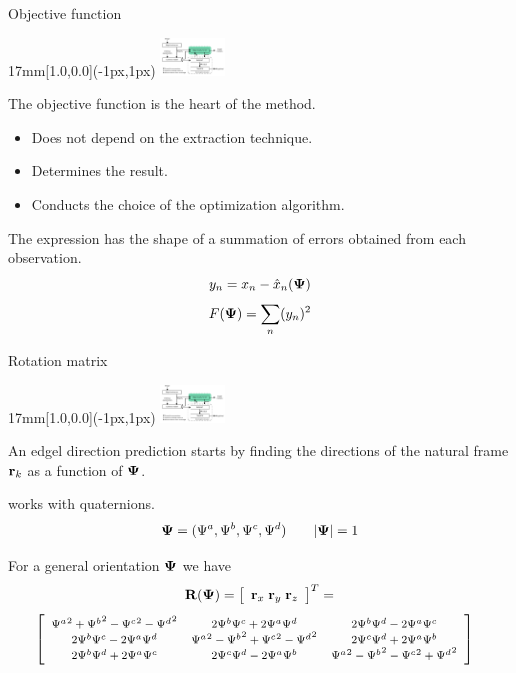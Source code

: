 \begin{frame}{Objective function}
  \begin{textblock*}{17mm}[1.0,0.0](\paperwidth-1px,1px)
    \includegraphics[width=17mm]{blocos_s3.png}
  \end{textblock*}

  The objective function is the heart of the method.\\
  \begin{itemize}
  \item Does not depend on the extraction technique.
  \item Determines the result.
  \item Conducts the choice of the optimization algorithm.
  \end{itemize}
  
  The expression has the shape of a summation of errors obtained from each observation.
  \[
  y_n = x_n - \hat{x}_n({\boldsymbol{\Psi}})
  \]\[
  F({\boldsymbol{\Psi}}) = \sum_n (y_n)^2
  \]
\end{frame}

\begin{frame}{Rotation matrix}
  \begin{textblock*}{17mm}[1.0,0.0](\paperwidth-1px,1px)
    \includegraphics[width=17mm]{blocos_s3.png}
  \end{textblock*}

  An edgel direction prediction starts by finding the directions of the natural frame
   ${\mathbf{r}}_k$ as a function of ${\boldsymbol{\Psi}}$.
  
  \corisco works with quaternions.
  \[
  {\boldsymbol{\Psi}} = ({\Psi^a}, {\Psi^b}, {\Psi^c}, {\Psi^d}) \qquad |{\boldsymbol{\Psi}}|=1
  \]
  
  For a general orientation ${\boldsymbol{\Psi}}$ we have
  \[
  \mathbf{R}({\boldsymbol{\Psi}}) =
  \left[
    \begin{array}{l}
      {\mathbf{r}}_x\;
      {\mathbf{r}}_y\;
      {\mathbf{r}}_z
    \end{array}
  \right]^T = 
  \]
  \[\hspace{-.8em}\footnotesize
  \left[
    \begin{array}{ccc}
      {\Psi^a}^2+{\Psi^b}^2-{\Psi^c}^2-{\Psi^d}^2 &2{\Psi^b}{\Psi^c}+2{\Psi^a}{\Psi^d} & 2{\Psi^b}{\Psi^d}-2{\Psi^a}{\Psi^c}\\
      2{\Psi^b}{\Psi^c}-2{\Psi^a}{\Psi^d}& {\Psi^a}^2-{\Psi^b}^2+{\Psi^c}^2-{\Psi^d}^2&2{\Psi^c}{\Psi^d}+2{\Psi^a}{\Psi^b}\\
      2{\Psi^b}{\Psi^d}+2{\Psi^a}{\Psi^c}& 2{\Psi^c}{\Psi^d}-2{\Psi^a}{\Psi^b}& {\Psi^a}^2-{\Psi^b}^2-{\Psi^c}^2+{\Psi^d}^2\\
    \end{array}
  \right]
  \]
\end{frame}

